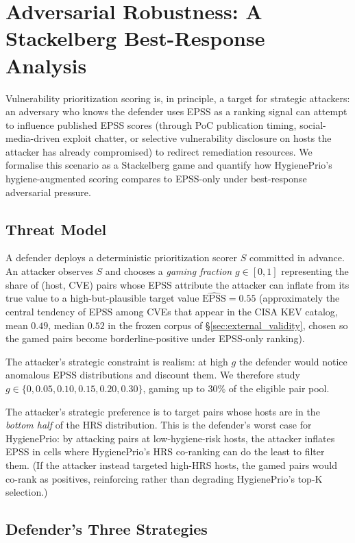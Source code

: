 \section{Adversarial Robustness: A Stackelberg Best-Response Analysis}
\label{sec:adversarial}

Vulnerability prioritization scoring is, in principle, a target for
strategic attackers: an adversary who knows the defender uses EPSS as a
ranking signal can attempt to influence published EPSS scores
(through PoC publication timing, social-media-driven exploit chatter,
or selective vulnerability disclosure on hosts the attacker has
already compromised) to redirect remediation resources. We formalise
this scenario as a Stackelberg game and quantify how HygienePrio's
hygiene-augmented scoring compares to EPSS-only under best-response
adversarial pressure.

\subsection{Threat Model}

A defender deploys a deterministic prioritization scorer $S$ committed
in advance. An attacker observes $S$ and chooses a \emph{gaming
fraction} $g \in [0, 1]$ representing the share of (host, CVE) pairs
whose EPSS attribute the attacker can inflate from its true value to a
high-but-plausible target value $\hat{\mathrm{EPSS}} = 0.55$
(approximately the central tendency of EPSS among CVEs that appear in
the CISA KEV catalog, mean $0.49$, median $0.52$ in the frozen
corpus of \S\ref{sec:external_validity}, chosen so the gamed pairs
become borderline-positive under EPSS-only ranking).

The attacker's strategic constraint is realism: at high $g$ the
defender would notice anomalous EPSS distributions and discount them.
We therefore study $g \in \{0, 0.05, 0.10, 0.15, 0.20, 0.30\}$, 
gaming up to 30\% of the eligible pair pool.

The attacker's strategic preference is to target pairs whose hosts
are in the \emph{bottom half} of the HRS distribution. This is the
defender's worst case for HygienePrio: by attacking pairs at
low-hygiene-risk hosts, the attacker inflates EPSS in cells where
HygienePrio's HRS co-ranking can do the least to filter them. (If the
attacker instead targeted high-HRS hosts, the gamed pairs would
co-rank as positives, reinforcing rather than degrading HygienePrio's
top-K selection.)

\subsection{Defender's Three Strategies}

